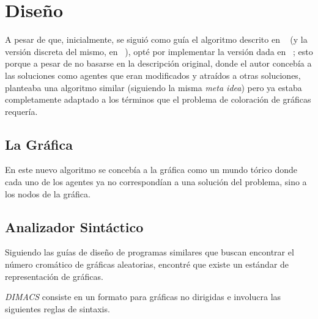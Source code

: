 \documentclass[a4paper]{report}
\begin{document}
\chapter{Dise\~no}
A pesar de que, inicialmente, se sigui\'o como gu\'ia el algoritmo descrito en
~\cite{gsa} (y la versi\'on discreta del mismo, en ~\cite{bgsa}), opt\'e por
implementar la versi\'on dada en ~\cite{israel}; esto porque a pesar de
no basarse en la descripci\'on original, donde el autor conceb\'ia a las soluciones
como agentes que eran modificados y atra\'idos a otras soluciones, planteaba una
algoritmo similar (siguiendo la misma \textit{meta idea}) pero
ya estaba completamente adaptado a los t\'erminos que el problema de coloraci\'on
de gr\'aficas requer\'ia.

\section{La Gr\'afica}

En este nuevo algoritmo se conceb\'ia a la gr\'afica como un mundo t\'orico donde
cada uno de los agentes ya no correspond\'ian a una soluci\'on del problema, sino
a los nodos de la gr\'afica.

\section{Analizador Sint\'actico}
Siguiendo las gu\'ias de dise\~no de programas similares que buscan encontrar el
n\'umero crom\'atico de gr\'aficas aleatorias, encontr\'e que existe un est\'andar
de representaci\'on de gr\'aficas.

\textit{DIMACS} consiste en un formato para gr\'aficas no dirigidas e involucra
las siguientes reglas de sintaxis.
\end{document}
